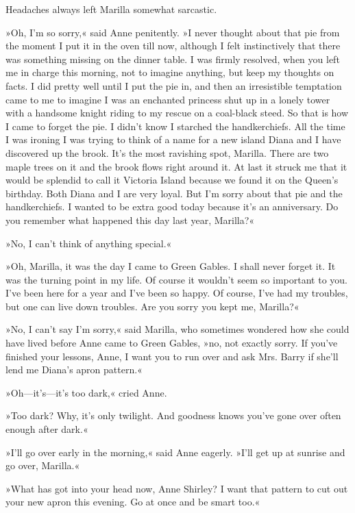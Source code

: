 Headaches always left Marilla somewhat sarcastic.

»Oh, I’m so sorry,« said Anne penitently. »I never thought about that pie from the moment I put it in the oven till now, although I felt instinctively that there was something missing on the dinner table. I was firmly resolved, when you left me in charge this morning, not to imagine anything, but keep my thoughts on facts. I did pretty well until I put the pie in, and then an irresistible temptation came to me to imagine I was an enchanted princess shut up in a lonely tower with a handsome knight riding to my rescue on a coal-black steed. So that is how I came to forget the pie. I didn’t know I starched the handkerchiefs. All the time I was ironing I was trying to think of a name for a new island Diana and I have discovered up the brook. It’s the most ravishing spot, Marilla. There are two maple trees on it and the brook flows right around it. At last it struck me that it would be splendid to call it Victoria Island because we found it on the Queen’s birthday. Both Diana and I are very loyal. But I’m sorry about that pie and the handkerchiefs. I wanted to be extra good today because it’s an anniversary. Do you remember what happened this day last year, Marilla?«

»No, I can’t think of anything special.«

»Oh, Marilla, it was the day I came to Green Gables. I shall never forget it. It was the turning point in my life. Of course it wouldn’t seem so important to you. I’ve been here for a year and I’ve been so happy. Of course, I’ve had my troubles, but one can live down troubles. Are you sorry you kept me, Marilla?«

»No, I can’t say I’m sorry,« said Marilla, who sometimes wondered how she could have lived before Anne came to Green Gables, »no, not exactly sorry. If you’ve finished your lessons, Anne, I want you to run over and ask Mrs. Barry if she’ll lend me Diana’s apron pattern.«

»Oh—it’s—it’s too dark,« cried Anne.

»Too dark? Why, it’s only twilight. And goodness knows you’ve gone over often enough after dark.«

»I’ll go over early in the morning,« said Anne eagerly. »I’ll get up at sunrise and go over, Marilla.«

»What has got into your head now, Anne Shirley? I want that pattern to cut out your new apron this evening. Go at once and be smart too.«

